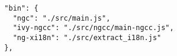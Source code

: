 \begin{verbatim}
  "bin": {
    "ngc": "./src/main.js",
    "ivy-ngcc": "./src/ngcc/main-ngcc.js",
    "ng-xi18n": "./src/extract_i18n.js"
  },
\end{verbatim}

